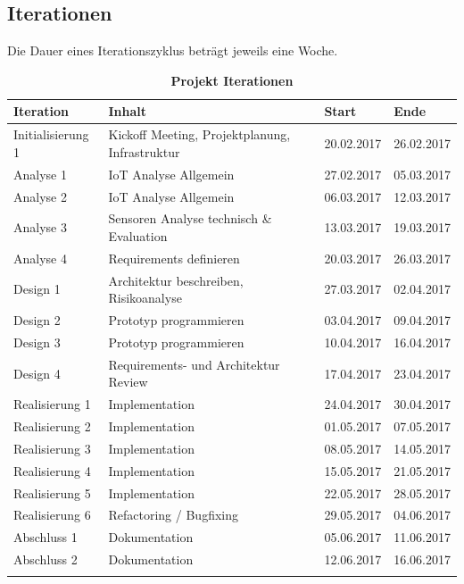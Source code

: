 \subsection{Iterationen}
Die Dauer eines Iterationszyklus beträgt jeweils eine Woche. 
\begin{table}[htb]
\centering
    \begin{tabular}{@{} p{3cm} l l l@{}}\toprule    
    {Iteration} & {Inhalt} & {Start} & {Ende}\\ \midrule
    Initialisierung 1 & Kickoff Meeting, Projektplanung, Infrastruktur & 20.02.2017 & 26.02.2017\\ \addlinespace
    Analyse 1 & IoT Analyse Allgemein & 27.02.2017 & 05.03.2017\\ \addlinespace
    Analyse 2 & IoT Analyse Allgemein & 06.03.2017 & 12.03.2017\\ \addlinespace
    Analyse 3 & Sensoren Analyse technisch \& Evaluation & 13.03.2017 & 19.03.2017\\ \addlinespace
    Analyse 4 & Requirements definieren & 20.03.2017 & 26.03.2017\\ \addlinespace
    Design 1 & Architektur beschreiben, Risikoanalyse & 27.03.2017 & 02.04.2017\\ \addlinespace
    Design 2 & Prototyp programmieren & 03.04.2017  & 09.04.2017\\ \addlinespace
    Design 3 & Prototyp programmieren & 10.04.2017  & 16.04.2017\\ \addlinespace
    Design 4 & Requirements- und Architektur Review & 17.04.2017  & 23.04.2017\\ \addlinespace
    Realisierung 1 & Implementation & 24.04.2017  & 30.04.2017\\ \addlinespace
    Realisierung 2 & Implementation & 01.05.2017  & 07.05.2017\\ \addlinespace
    Realisierung 3 & Implementation & 08.05.2017  & 14.05.2017\\ \addlinespace
    Realisierung 4 & Implementation & 15.05.2017  & 21.05.2017\\ \addlinespace
    Realisierung 5 & Implementation & 22.05.2017  & 28.05.2017\\ \addlinespace
    Realisierung 6 & Refactoring / Bugfixing & 29.05.2017  & 04.06.2017\\ \addlinespace
    Abschluss 1 & Dokumentation &  05.06.2017 & 11.06.2017\\ \addlinespace
    Abschluss 2 & Dokumentation &  12.06.2017 & 16.06.2017\\ \addlinespace
    \bottomrule
    \end{tabular}
\caption{\textbf{Projekt Iterationen}}
\end{table}

